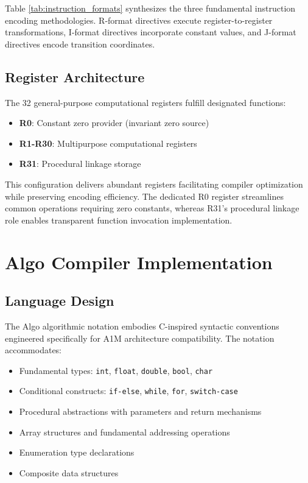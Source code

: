 \documentclass[conference,10pt,twocolumn]{IEEEtran}
\begin{document}
Table \ref{tab:instruction_formats} synthesizes the three fundamental instruction encoding methodologies. R-format directives execute register-to-register transformations, I-format directives incorporate constant values, and J-format directives encode transition coordinates.

\subsection{Register Architecture}

The 32 general-purpose computational registers fulfill designated functions:

\begin{itemize}
\item \textbf{R0}: Constant zero provider (invariant zero source)
\item \textbf{R1-R30}: Multipurpose computational registers
\item \textbf{R31}: Procedural linkage storage
\end{itemize}

This configuration delivers abundant registers facilitating compiler optimization while preserving encoding efficiency. The dedicated R0 register streamlines common operations requiring zero constants, whereas R31's procedural linkage role enables transparent function invocation implementation.

\section{Algo Compiler Implementation}

\subsection{Language Design}

The Algo algorithmic notation embodies C-inspired syntactic conventions engineered specifically for A1M architecture compatibility. The notation accommodates:

\begin{itemize}
\item Fundamental types: \texttt{int}, \texttt{float}, \texttt{double}, \texttt{bool}, \texttt{char}
\item Conditional constructs: \texttt{if-else}, \texttt{while}, \texttt{for}, \texttt{switch-case}
\item Procedural abstractions with parameters and return mechanisms
\item Array structures and fundamental addressing operations
\item Enumeration type declarations
\item Composite data structures
\end{itemize}
\end{document}

